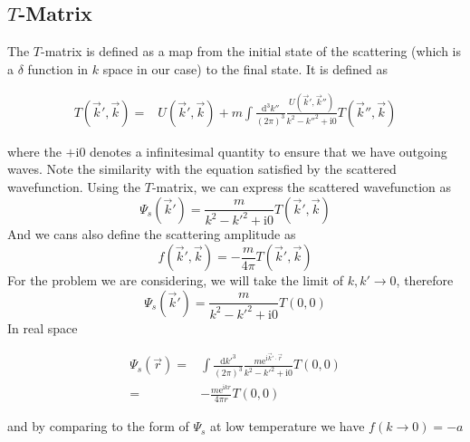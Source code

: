 \documentclass[aps,twocolumn,secnumarabic,balancelastpage,amsmath,amssymb,nofootinbib]{revtex4}
\newcommand{\ud}{\mathrm{d}}
\newcommand{\ue}{\mathrm{e}}
\newcommand{\ui}{\mathrm{i}}
\newcommand{\eqar}[1]
{
  \begin{align*}
    #1
  \end{align*}
}
\newcommand{\paren}[1]{{\left({#1}\right)}}
\begin{document}
\subsection{$T$-Matrix}
The $T$-matrix is defined as a map from the initial state of the scattering (which is a $\delta$ function in $k$ space in our case) to the final state. It is defined as
\eqar{
  T\paren{\vec k', \vec k}=&U\paren{\vec k', \vec k}+m\int\frac{\ud^3k''}{\paren{2\pi}^3}\frac{U\paren{\vec k', \vec k''}}{k^2-k''^2+\ui 0}T\paren{\vec k'', \vec k}}
where the $+\ui 0$ denotes a infinitesimal quantity to ensure that we have outgoing waves. Note the similarity with the equation satisfied by the scattered wavefunction. Using the $T$-matrix, we can express the scattered wavefunction as
\[\Psi_s\paren{\vec k'}=\frac{m}{k^2-k'^2+\ui 0}T\paren{\vec k', \vec k}\]
And we cans also define the scattering amplitude as
\[f\paren{\vec k', \vec k}=-\frac{m}{4\pi}T\paren{\vec k', \vec k}\]
For the problem we are considering, we will take the limit of $k, k'\rightarrow0$, therefore
\[\Psi_s\paren{\vec k'}=\frac{m}{k^2-k'^2+\ui 0}T\paren{0, 0}\]
In real space
\eqar{
  \Psi_s\paren{\vec r}=&\int\frac{\ud k'^3}{\paren{2\pi}^3}\frac{m\ue^{\ui\vec k'\cdot\vec r}}{k^2-k'^2+\ui 0}T\paren{0, 0}\\
  =&-\frac{m\ue^{\ui kr}}{4\pi r}T\paren{0, 0}
}
and by comparing to the form of $\Psi_s$ at low temperature we have $f(k\rightarrow0)=-a$
\end{document}
